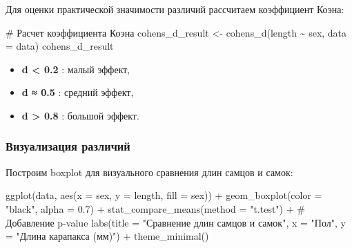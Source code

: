 \documentclass[
  letterpaper,
  DIV=11,
  numbers=noendperiod]{scrreprt}
\newenvironment{Shaded}{\begin{snugshade}}{\end{snugshade}}
\newcommand{\AttributeTok}[1]{\textcolor[rgb]{0.40,0.45,0.13}{#1}}
\newcommand{\CommentTok}[1]{\textcolor[rgb]{0.37,0.37,0.37}{#1}}
\newcommand{\FloatTok}[1]{\textcolor[rgb]{0.68,0.00,0.00}{#1}}
\newcommand{\FunctionTok}[1]{\textcolor[rgb]{0.28,0.35,0.67}{#1}}
\newcommand{\NormalTok}[1]{\textcolor[rgb]{0.00,0.23,0.31}{#1}}
\newcommand{\OtherTok}[1]{\textcolor[rgb]{0.00,0.23,0.31}{#1}}
\newcommand{\SpecialCharTok}[1]{\textcolor[rgb]{0.37,0.37,0.37}{#1}}
\newcommand{\StringTok}[1]{\textcolor[rgb]{0.13,0.47,0.30}{#1}}
\begin{document}
Для оценки практической значимости различий рассчитаем коэффициент
Коэна:

\begin{Shaded}
\begin{Highlighting}[]
\CommentTok{\# Расчет коэффициента Коэна  }
\NormalTok{cohens\_d\_result }\OtherTok{\textless{}{-}} \FunctionTok{cohens\_d}\NormalTok{(length }\SpecialCharTok{\textasciitilde{}}\NormalTok{ sex, }\AttributeTok{data =}\NormalTok{ data)  }
\NormalTok{cohens\_d\_result  }
\end{Highlighting}
\end{Shaded}

\begin{itemize}
\item
  \textbf{d \textless{} 0.2} : малый эффект,
\item
  \textbf{d ≈ 0.5} : средний эффект,
\item
  \textbf{d \textgreater{} 0.8} : большой эффект.
\end{itemize}

\subsubsection{\texorpdfstring{\textbf{Визуализация
различий}}{Визуализация различий}}\label{ux432ux438ux437ux443ux430ux43bux438ux437ux430ux446ux438ux44f-ux440ux430ux437ux43bux438ux447ux438ux439}

Построим boxplot для визуального сравнения длин самцов и самок:

\begin{Shaded}
\begin{Highlighting}[]
\FunctionTok{ggplot}\NormalTok{(data, }\FunctionTok{aes}\NormalTok{(}\AttributeTok{x =}\NormalTok{ sex, }\AttributeTok{y =}\NormalTok{ length, }\AttributeTok{fill =}\NormalTok{ sex)) }\SpecialCharTok{+}  
  \FunctionTok{geom\_boxplot}\NormalTok{(}\AttributeTok{color =} \StringTok{"black"}\NormalTok{, }\AttributeTok{alpha =} \FloatTok{0.7}\NormalTok{) }\SpecialCharTok{+}  
  \FunctionTok{stat\_compare\_means}\NormalTok{(}\AttributeTok{method =} \StringTok{"t.test"}\NormalTok{) }\SpecialCharTok{+}  \CommentTok{\# Добавление p{-}value  }
  \FunctionTok{labs}\NormalTok{(}\AttributeTok{title =} \StringTok{"Сравнение длин самцов и самок"}\NormalTok{,  }
       \AttributeTok{x =} \StringTok{"Пол"}\NormalTok{, }\AttributeTok{y =} \StringTok{"Длина карапакса (мм)"}\NormalTok{) }\SpecialCharTok{+}  
  \FunctionTok{theme\_minimal}\NormalTok{() }
\end{Highlighting}
\end{Shaded}
\end{document}
